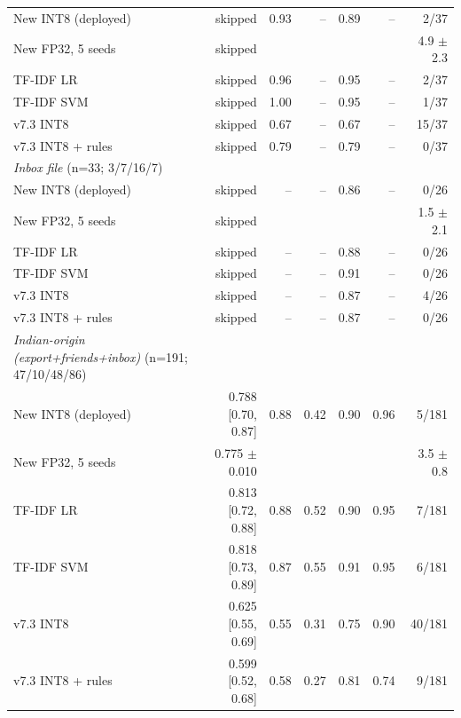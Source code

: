 \begin{table}[t]
\begin{tabular}{lrrrrrr}
New INT8 (deployed) & skipped & 0.93 & -- & 0.89 & -- & 2/37 \\
New FP32, 5 seeds & skipped &  &  &  &  & 4.9 $\pm$ 2.3 \\
TF-IDF LR & skipped & 0.96 & -- & 0.95 & -- & 2/37 \\
TF-IDF SVM & skipped & 1.00 & -- & 0.95 & -- & 1/37 \\
v7.3 INT8 & skipped & 0.67 & -- & 0.67 & -- & 15/37 \\
v7.3 INT8 + rules & skipped & 0.79 & -- & 0.79 & -- & 0/37 \\
\textit{Inbox file} (n=33; 3/7/16/7) &  &  &  &  &  &  \\
New INT8 (deployed) & skipped & -- & -- & 0.86 & -- & 0/26 \\
New FP32, 5 seeds & skipped &  &  &  &  & 1.5 $\pm$ 2.1 \\
TF-IDF LR & skipped & -- & -- & 0.88 & -- & 0/26 \\
TF-IDF SVM & skipped & -- & -- & 0.91 & -- & 0/26 \\
v7.3 INT8 & skipped & -- & -- & 0.87 & -- & 4/26 \\
v7.3 INT8 + rules & skipped & -- & -- & 0.87 & -- & 0/26 \\
\textit{Indian-origin (export+friends+inbox)} (n=191; 47/10/48/86) &  &  &  &  &  &  \\
New INT8 (deployed) & 0.788 [0.70, 0.87] & 0.88 & 0.42 & 0.90 & 0.96 & 5/181 \\
New FP32, 5 seeds & 0.775 $\pm$ 0.010 &  &  &  &  & 3.5 $\pm$ 0.8 \\
TF-IDF LR & 0.813 [0.72, 0.88] & 0.88 & 0.52 & 0.90 & 0.95 & 7/181 \\
TF-IDF SVM & 0.818 [0.73, 0.89] & 0.87 & 0.55 & 0.91 & 0.95 & 6/181 \\
v7.3 INT8 & 0.625 [0.55, 0.69] & 0.55 & 0.31 & 0.75 & 0.90 & 40/181 \\
v7.3 INT8 + rules & 0.599 [0.52, 0.68] & 0.58 & 0.27 & 0.81 & 0.74 & 9/181 \\
\bottomrule
\end{tabular}
\end{table}
